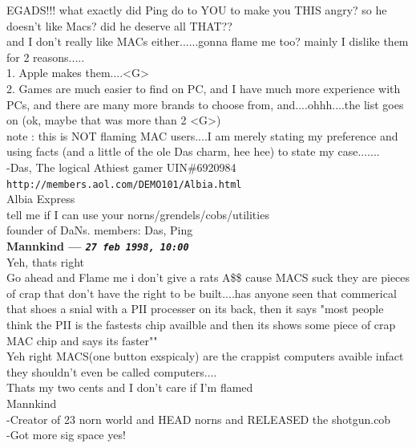 \documentclass[11pt,twoside,a4paper]{article}
\begin{document}
\begin{multicols*}{2}
EGADS!!!  what exactly did Ping do to YOU to make you THIS angry?  so he doesn't like Macs?  did he deserve all THAT??~\\

and I don't really like MACs either......gonna flame me too?  mainly I dislike them for 2 reasons.....~\\
1.  Apple makes them....<G>~\\
2.  Games are much easier to find on PC, and I have much more experience with PCs, and there are many more brands to choose from, and....ohhh....the list goes on (ok, maybe that was more than 2 <G>)~\\

note :  this is NOT flaming MAC users....I am merely stating my preference and using facts (and a little of the ole Das charm, hee hee) to state my case.......~\\

-Das, The logical Athiest gamer   UIN\#6920984~\\
\texttt{http://members.aol.com/DEMO101/Albia.html}~\\
Albia Express~\\
tell me if I can use your norns/grendels/cobs/utilities~\\
founder of DaNs. members: Das, Ping~\\


		
\textbf{Mannkind --- \emph{\texttt{27 feb 1998, 10:00}}}~\\

Yeh, thats right~\\
Go ahead and Flame me i don't give a rats A\$\$ cause MACS suck they are pieces of crap that don't have the right to be built....has anyone seen that commerical that shoes a snial with a PII processer on its back, then it says "most people think the PII is the fastests chip availble and then its shows some piece of crap MAC chip and says its faster""~\\
Yeh right MACS(one button exspicaly) are the crappist computers avaible infact they shouldn't even be called computers....~\\

Thats my two cents and I don't care if I'm flamed~\\

Mannkind~\\
-Creator of 23 norn world and HEAD norns and RELEASED the shotgun.cob~\\
-Got more sig space yes!~\\


\end{multicols*}
\end{document}
